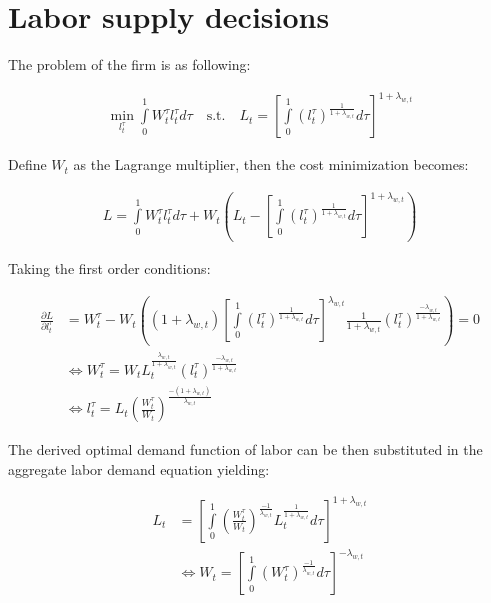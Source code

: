 \documentclass{pracamgr}
\numberwithin{equation}{section}
\begin{document}
\section*{Labor supply decisions}

The problem of the firm is as following:

\begin{align}
\min_{l_{t}^{\tau}} \int\limits_{0}^{1} W_{t}^{\tau} l_{t}^{\tau} d\tau \quad \text{s.t.} \quad L_{t} = \left[ \int\limits_{0}^{1} \left( l_{t}^{\tau} \right)^{\frac{1}{1+\lambda_{w,t}}} d\tau \right]^{1+\lambda_{w,t}}
\end{align}

Define $W_{t}$ as the Lagrange multiplier, then the cost minimization becomes:

\begin{align}
L = \int\limits_{0}^{1} W_{t}^{\tau} l_{t}^{\tau} d\tau + W_{t} \left( L_{t} - \left[ \int\limits_{0}^{1} \left( l_{t}^{\tau} \right)^{\frac{1}{1+\lambda_{w,t}}} d\tau \right]^{1+\lambda_{w,t}} \right)
\end{align}

{\color{red} Taking the first order conditions:

\begin{align} \label{Optimal demand function for labor}
\frac{\partial L}{\partial l_{t}^{\tau}} &= W_{t}^{\tau} - W_{t} \left( \left( 1+\lambda_{w ,t} \right) \left[  \int\limits_{0}^{1} \left( l_{t}^{\tau} \right)^{\frac{1}{1+\lambda_{w ,t}}} d\tau \right]^{\lambda_{w ,t}} \frac{1}{1+\lambda_{w ,t}}  \left( l_{t}^{\tau} \right)^{\frac{-\lambda_{w ,t}}{1+\lambda_{w ,t}}} \right) = 0 \nonumber \\
& \iff W_{t}^{\tau} = W_{t} L_{t}^{\frac{\lambda_{w ,t}}{1+\lambda_{w,t}}} \left( l_{t}^{\tau} \right)^{\frac{-\lambda_{w,t}}{1+\lambda_{w ,t}}} \nonumber \\
& \iff l_{t}^{\tau}= L_{t} \left( \frac{W_{t}^{\tau}}{W_{t}}\right)^{\frac{-(1+\lambda_{w,t})}{\lambda_{w ,t}}}
\end{align} }

The derived optimal demand function of labor can be then substituted in the aggregate labor demand equation yielding:

\begin{align}
L_{t} &= \left[ \int\limits_{0}^{1} \left( \frac{W_{t}^{\tau}}{W_{t}}\right)^{\frac{-1}{\lambda_{w ,t}}} L_{t}^{\frac{1}{1+\lambda_{w ,t}}} d\tau \right]^{1+\lambda_{w,t}} \nonumber \\
& \iff W_{t} = \left[ \int\limits_{0}^{1} \left( W_{t}^{\tau} \right)^{\frac{-1}{\lambda_{w ,t}}}  d\tau \right]^{-\lambda_{w,t}}
\end{align}
\end{document}
